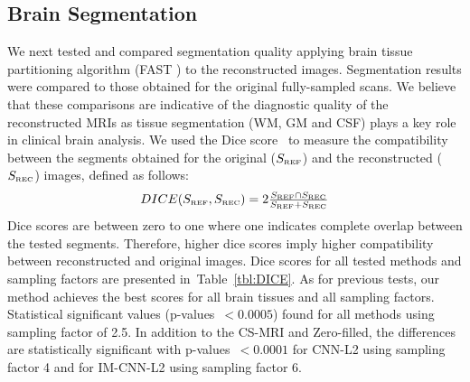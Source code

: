\documentclass[review]{elsarticle}
\begin{document}
\subsection{Brain Segmentation}
We next tested and compared segmentation quality applying brain tissue partitioning algorithm (FAST \cite{zhang2001segmentation}) to the reconstructed images. Segmentation results were compared to those obtained for the original fully-sampled scans. We believe that these comparisons are indicative of the diagnostic quality of the reconstructed MRIs as tissue segmentation (WM, GM and CSF) plays a key role in clinical brain analysis.
We used the Dice score~\cite{dice1945measures} to measure the compatibility between the segments obtained for the original ($S_{\mbox{\tiny{REF}}}$) and the reconstructed ($S_{\mbox{\tiny{REC}}}$) images, defined as follows:
\begin{equation}
\begin{array}{c}
DICE(S_{\mbox{\tiny{REF}}}, S_{\mbox{\tiny{REC}}}) = 2\frac{S_{\mbox{\tiny{REF}}} \cap S_{\mbox{\tiny{REC}}}}{S_{\mbox{\tiny{REF}}} + S_{\mbox{\tiny{REC}}}}
\end{array}
\end{equation}
Dice scores are between zero to one where one indicates complete overlap between the tested segments. Therefore, higher dice scores imply higher compatibility between reconstructed and original images.
Dice scores for all tested methods and sampling factors are presented in~Table~\ref{tbl:DICE}. As for previous tests, our method achieves the best scores for all brain tissues and all sampling factors. Statistical significant values (p-values~$<0.0005$) found for all methods using sampling factor of 2.5. In addition to the CS-MRI and Zero-filled, the differences are statistically significant with p-values~$<0.0001$ for CNN-L2 using sampling factor 4 and for IM-CNN-L2 using sampling factor 6.
\end{document}

